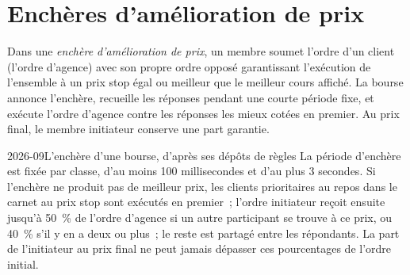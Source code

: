 \section{Enchères d'amélioration de prix}

\begin{definition}\label{def:m1:options-market-structure:auction}
Dans une \emph{enchère d'amélioration de prix}, un
membre soumet l'ordre d'un client (l'ordre d'agence) avec son propre ordre
opposé garantissant l'exécution de l'ensemble à un prix stop égal ou meilleur
que le meilleur cours affiché. La bourse annonce l'enchère, recueille les
réponses pendant une courte période fixe, et exécute l'ordre d'agence contre les
réponses les mieux cotées en premier. Au prix final, le membre initiateur conserve
une part garantie.
\end{definition}

\begin{dated}{2026-09}{L'enchère d'une bourse, d'après ses dépôts de règles}\label{dat:m1:options-market-structure:aim}
La période d'enchère est fixée par classe, d'au moins 100 millisecondes et
d'au plus 3 secondes. Si l'enchère ne produit pas de meilleur prix, les clients
prioritaires au repos dans le carnet au prix stop sont exécutés en premier~; l'ordre
initiateur reçoit ensuite jusqu'à 50~\% de l'ordre d'agence si un autre
participant se trouve à ce prix, ou 40~\% s'il y en a deux ou plus~; le reste est
partagé entre les répondants. La part de l'initiateur au prix final ne peut jamais
dépasser ces pourcentages de l'ordre initial.
\end{dated}

\begin{omfigure}

\label{fig:m1:options-market-structure:timeline}
\end{omfigure}

